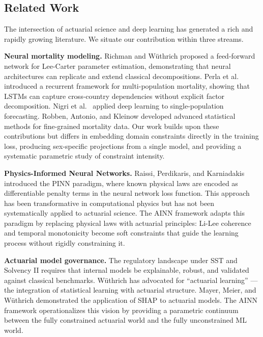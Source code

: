 \documentclass[11pt,a4paper]{article}
\begin{document}
\subsection{Related Work}

The intersection of actuarial science and deep learning has generated a rich and rapidly growing literature. We situate our contribution within three streams.

\textbf{Neural mortality modeling.} Richman and W\"uthrich \cite{richman2021} proposed a feed-forward network for Lee-Carter parameter estimation, demonstrating that neural architectures can replicate and extend classical decompositions. Perla et al.\ \cite{perla2021} introduced a recurrent framework for multi-population mortality, showing that LSTMs can capture cross-country dependencies without explicit factor decomposition. Nigri et al.\ \cite{nigri2019} applied deep learning to single-population forecasting. Robben, Antonio, and Kleinow \cite{robben2025} developed advanced statistical methods for fine-grained mortality data. Our work builds upon these contributions but differs in embedding domain constraints directly in the training loss, producing sex-specific projections from a single model, and providing a systematic parametric study of constraint intensity.

\textbf{Physics-Informed Neural Networks.} Raissi, Perdikaris, and Karniadakis \cite{raissi2019pinn} introduced the PINN paradigm, where known physical laws are encoded as differentiable penalty terms in the neural network loss function. This approach has been transformative in computational physics but has not been systematically applied to actuarial science. The AINN framework adapts this paradigm by replacing physical laws with actuarial principles: Li-Lee coherence and temporal monotonicity become soft constraints that guide the learning process without rigidly constraining it.

\textbf{Actuarial model governance.} The regulatory landscape under SST \cite{swissre2022} and Solvency II requires that internal models be explainable, robust, and validated against classical benchmarks. W\"uthrich \cite{wuthrich2021statistical} has advocated for ``actuarial learning'' --- the integration of statistical learning with actuarial structure. Mayer, Meier, and W\"uthrich \cite{shapforactuaries2023} demonstrated the application of SHAP to actuarial models. The AINN framework operationalizes this vision by providing a parametric continuum between the fully constrained actuarial world and the fully unconstrained ML world.
\end{document}
